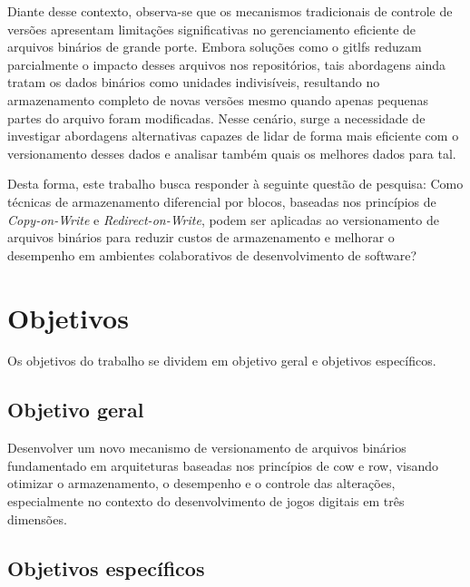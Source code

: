 Diante desse contexto, observa-se que os mecanismos tradicionais de controle de versões apresentam limitações significativas no gerenciamento eficiente de arquivos binários de grande porte. Embora soluções como o \gls{gitlfs} reduzam parcialmente o impacto desses arquivos nos repositórios, tais abordagens ainda tratam os dados binários como unidades indivisíveis, resultando no armazenamento completo de novas versões mesmo quando apenas pequenas partes do arquivo foram modificadas. Nesse cenário, surge a necessidade de investigar abordagens alternativas capazes de lidar de forma mais eficiente com o versionamento desses dados e analisar também quais os melhores dados para tal.

Desta forma, este trabalho busca responder à seguinte questão de pesquisa: Como técnicas de armazenamento diferencial por blocos, baseadas nos princípios de \textit{Copy-on-Write} e \textit{Redirect-on-Write}, podem ser aplicadas ao versionamento de arquivos binários para reduzir custos de armazenamento e melhorar o desempenho em ambientes colaborativos de desenvolvimento de software?

\section{Objetivos}\label{sec:objetivos}

Os objetivos do trabalho se dividem em objetivo geral e objetivos específicos.

\subsection{Objetivo geral}\label{subsec:objetivoGeral}

Desenvolver um novo mecanismo de versionamento de arquivos binários fundamentado em arquiteturas baseadas nos princípios de \gls{cow} e \gls{row}, visando otimizar o armazenamento, o desempenho e o controle das alterações, especialmente no contexto do desenvolvimento de jogos digitais em três dimensões.

\subsection{Objetivos específicos}\label{subsec:objetivosEspecificos}

